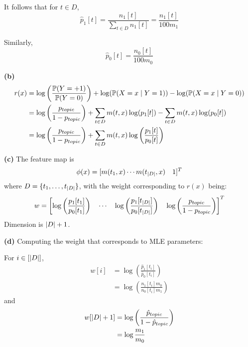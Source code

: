 \documentclass[a4paper, 11pt]{article}
\begin{document}
\begin{problem}
It follows that for $t \in D$, \begin{equation*}
    \hat{p}_1[t] = \frac{n_1[t]}{\sum_{t \in D} n_1[t]} = \frac{n_1[t]}{100m_1}
\end{equation*}

Similarly, \begin{equation*}
\hat{p}_0[t] = \frac{n_0[t]}{100 m_0}
\end{equation*}

\textbf{(b)} 
\begin{align*}
    r(x) &= \log \left(\frac{\mathbb{P}(Y = +1)}{\mathbb{P}(Y = 0)}\right) + \log(\mathbb{P}(X = x \mid Y = 1)) - \log (\mathbb{P}(X = x \mid Y = 0)) \\
    &= \log \left(\frac{p_{topic}}{1 - p_{topic}}\right) + \sum_{t \in D} m(t, x) \log (p_1[t]) - \sum_{t \in D} m(t, x) \log(p_0[t]) \\
    &= \log \left(\frac{p_{topic}}{1 - p_{topic}}\right)  + \sum_{t \in D} m(t, x) \log \left(\frac{p_1[t]}{p_0[t]}\right)
\end{align*}

\textbf{(c)} The feature map is \begin{equation*}
\phi(x) = [ m(t_1, x) \cdots m(t_{\lvert D\rvert}, x) \quad 1]^T
\end{equation*}
where $D = \{t_1, \ldots, t_{\lvert D\rvert}\}$, with the weight corresponding to $r(x)$ being: \begin{equation*}
w = \left[ \log\left(\frac{p_1[t_1]}{p_0[t_1]}\right) \quad \cdots \quad \log\left(\frac{p_1[t_{\lvert D\rvert}]}{p_0[t_{\lvert D\rvert}]}\right) \quad \log \left(\frac{p_{topic}}{1 - p_{topic}}\right)\right]^T
\end{equation*}
Dimension is $\lvert D\rvert + 1$.
\end{problem}
\textbf{(d)} Computing the weight that corresponds to MLE parameters:

For $i \in [\lvert D\rvert]$,
\begin{align*}
    w[i] &= \log\left(\frac{\hat{p}_1[t_i]}{\hat{p}_0[t_i]}\right) \\
    &= \log\left(\frac{n_1[t_i]m_0}{n_0[t_i]m_1}\right)
\end{align*}
and \begin{align*}
    w[\lvert D\rvert + 1] &= \log \left(\frac{\hat{p}_{topic}}{1 - \hat{p}_{topic}}\right) \\
    &= \log \frac{m_1}{m_0}
\end{align*}
\end{document}
